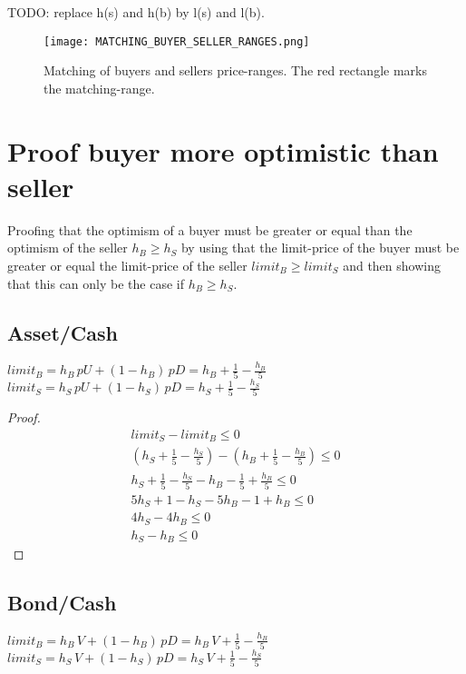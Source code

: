 \documentclass[Bachelorarbeit.tex]{subfiles}
\begin{document}
TODO: replace h(s) and h(b) by l(s) and l(b).

\begin{figure}[H]
	\centering
  \texttt{[image: MATCHING\_BUYER\_SELLER\_RANGES.png]}
  	\caption{Matching of buyers and sellers price-ranges. The red rectangle marks the matching-range.}
	\label{fig:MATCHING_BUYER_SELLER_RANGES}
\end{figure}

\section{Proof buyer more optimistic than seller}
Proofing that the optimism of a buyer must be greater or equal than the optimism of the seller $h_B \geq h_S$ by using that the limit-price of the buyer must be greater or equal the limit-price of the seller $limit_B \geq limit_S$ and then showing that this can only be the case if $h_B \geq h_S$.

\subsection{Asset/Cash}
$limit_B = h_B \, pU + (1-h_B) \, pD = h_B + \frac{1}{5} - \frac{h_B}{5}$ \\
$limit_S = h_S \, pU + (1-h_S) \, pD = h_S + \frac{1}{5} - \frac{h_S}{5}$

\begin{proof}
\begin{align*}
	limit_S - limit_B \leq 0
	\\ (h_S + \frac{1}{5} - \frac{h_S}{5}) - ( h_B + \frac{1}{5} - \frac{h_B}{5} ) \leq 0
	\\ h_S + \frac{1}{5} - \frac{h_S}{5} - h_B - \frac{1}{5} + \frac{h_B}{5} \leq 0
	\\ 5h_S + 1 - h_S - 5h_B - 1 + h_B \leq 0
	\\ 4h_S - 4h_B \leq 0
	\\ h_S - h_B \leq 0		\tag*{can only hold if $h_B \geq h_S$}
\end{align*}
\end{proof}

\subsection{Bond/Cash}
$limit_B = h_B \, V + (1-h_B) \, pD = h_B \, V + \frac{1}{5} - \frac{h_B}{5}$ \\
$limit_S = h_S \, V + (1-h_S) \, pD = h_S \, V + \frac{1}{5} - \frac{h_S}{5}$
\end{document}

